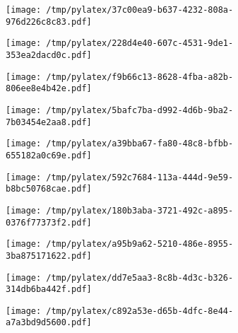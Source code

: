 \documentclass{article}
\begin{document}
\begin{figure}[htbp]
\begin{subfigure}[b]{.3\linewidth}
\texttt{[image: /tmp/pylatex/37c00ea9-b637-4232-808a-976d226c8c83.pdf]}
\end{subfigure}
\begin{subfigure}[b]{.3\linewidth}
\texttt{[image: /tmp/pylatex/228d4e40-607c-4531-9de1-353ea2dacd0c.pdf]}
\end{subfigure}
\begin{subfigure}[b]{.3\linewidth}
\texttt{[image: /tmp/pylatex/f9b66c13-8628-4fba-a82b-806ee8e4b42e.pdf]}
\end{subfigure}
\begin{subfigure}[b]{.3\linewidth}
\texttt{[image: /tmp/pylatex/5bafc7ba-d992-4d6b-9ba2-7b03454e2aa8.pdf]}
\end{subfigure}
\begin{subfigure}[b]{.3\linewidth}
\texttt{[image: /tmp/pylatex/a39bba67-fa80-48c8-bfbb-655182a0c69e.pdf]}
\end{subfigure}
\begin{subfigure}[b]{.3\linewidth}
\texttt{[image: /tmp/pylatex/592c7684-113a-444d-9e59-b8bc50768cae.pdf]}
\end{subfigure}
\begin{subfigure}[b]{.3\linewidth}
\texttt{[image: /tmp/pylatex/180b3aba-3721-492c-a895-0376f77373f2.pdf]}
\end{subfigure}
\begin{subfigure}[b]{.3\linewidth}
\texttt{[image: /tmp/pylatex/a95b9a62-5210-486e-8955-3ba875171622.pdf]}
\end{subfigure}
\begin{subfigure}[b]{.3\linewidth}
\texttt{[image: /tmp/pylatex/dd7e5aa3-8c8b-4d3c-b326-314db6ba442f.pdf]}
\end{subfigure}
\begin{subfigure}[b]{.3\linewidth}
\texttt{[image: /tmp/pylatex/c892a53e-d65b-4dfc-8e44-a7a3bd9d5600.pdf]}
\end{subfigure}
\end{figure}
\end{document}
